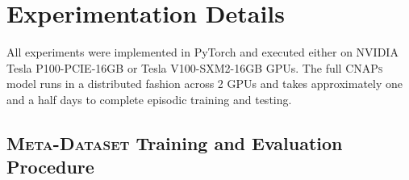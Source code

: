 \documentclass{article}
\theoremstyle{definition}
\newcommand{\cnaps}{\textsc{CNAPs}}
\begin{document}
\section{Experimentation Details}
\label{app: experimentation_details}
All experiments were implemented in PyTorch \citep{paszke2017automatic} and executed either on NVIDIA Tesla P100-PCIE-16GB or Tesla V100-SXM2-16GB GPUs. The full \cnaps{} model runs in a distributed fashion across 2 GPUs and takes approximately one and a half days to complete episodic training and testing.

\subsection{\textsc{Meta-Dataset} Training and Evaluation Procedure}
\label{app:meta_dataset_procedure}
\end{document}
